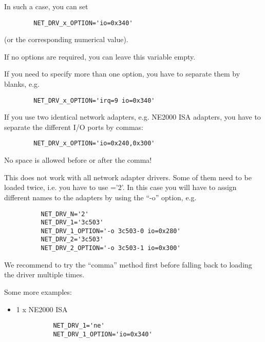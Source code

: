 \begin{description}
{    In such a case, you can set
\begin{example}
\begin{verbatim}
        NET_DRV_x_OPTION='io=0x340'
\end{verbatim}
\end{example}

    (or the corresponding numerical value).

    If no options are required, you can leave this variable empty.

    If you need to specify more than one option, you have to separate them
    by blanks, e.g.
\begin{example}
\begin{verbatim}
        NET_DRV_x_OPTION='irq=9 io=0x340'
\end{verbatim}
\end{example}

    If you use two identical network adapters, e.g. NE2000 ISA adapters,
    you have to separate the different I/O ports by commas:

\begin{example}
\begin{verbatim}
        NET_DRV_x_OPTION='io=0x240,0x300'
\end{verbatim}
\end{example}

    No space is allowed before or after the comma!

    This does not work with all network adapter drivers. Some of them need to
    be loaded twice, i.e. you have to use ='2'. In this
    case you will have to assign different names to the adapters by using the
    ``-o'' option, e.g.

\begin{example}
\begin{verbatim}
          NET_DRV_N='2'
          NET_DRV_1='3c503'
          NET_DRV_1_OPTION='-o 3c503-0 io=0x280'
          NET_DRV_2='3c503'
          NET_DRV_2_OPTION='-o 3c503-1 io=0x300'
\end{verbatim}
\end{example}

    We recommend to try the ``comma'' method first before falling back to
    loading the driver multiple times.

    Some more examples:

    \begin{itemize}
    \item 1 x NE2000 ISA
\begin{example}
\begin{verbatim}
          NET_DRV_1='ne'
          NET_DRV_1_OPTION='io=0x340'
\end{verbatim}
\end{example}


\end{itemize}}
\end{description}
